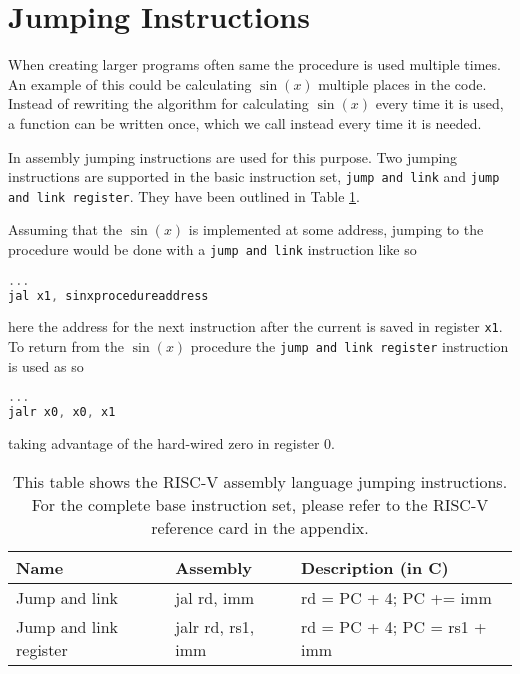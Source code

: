     \section{Jumping Instructions}
        When creating larger programs often same the procedure is used multiple times. An example of this could be calculating $\sin(x)$ multiple places in the code. Instead of rewriting the algorithm for calculating $\sin(x)$ every time it is used, a function can be written once, which we call instead every time it is needed.
        
        In assembly jumping instructions are used for this purpose. Two jumping instructions are supported in the basic instruction set, \texttt{jump and link} and \texttt{jump and link register}. They have been outlined in Table \ref{table:RISCVJumpingInstructions}.
        
        Assuming that the $\sin(x)$ is implemented at some address, jumping to the procedure would be done with a \texttt{jump and link} instruction like so
        \begin{lstlisting}[language=C]
...
jal x1, sinxprocedureaddress
        \end{lstlisting}
        here the address for the next instruction after the current is saved in register \texttt{x1}. To return from the $\sin(x)$ procedure the \texttt{jump and link register} instruction is used as so
        \begin{lstlisting}[language=C]
...
jalr x0, x0, x1
        \end{lstlisting}
        taking advantage of the hard-wired zero in register 0.
        
        \begin{table}[h!]
            \centering
            \begin{tabular}{|l|l|l|}
            	\hline
            	Name                   & Assembly          & Description (in C)          \\ \hline
            	Jump and link          & jal rd, imm       & rd = PC + 4; PC += imm      \\
            	Jump and link register & jalr rd, rs1, imm & rd = PC + 4; PC = rs1 + imm \\ \hline
            \end{tabular}
            \caption{This table shows the RISC-V assembly language jumping instructions. For the complete base instruction set, please refer to the RISC-V reference card in the appendix.}
            \label{table:RISCVJumpingInstructions}
        \end{table}
    
